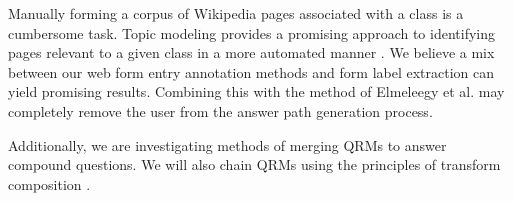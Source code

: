 Manually forming a corpus of Wikipedia pages associated with a class is a cumbersome task. Topic modeling provides a promising approach to identifying pages relevant to a given class in a more automated manner \cite{Blei2003latentdirichlet}. We believe a mix between our web form entry annotation methods and form label extraction \cite{1453931} can yield promising results. Combining this with the method of Elmeleegy et al. \cite{1687749} may completely remove the user from the answer path generation process.

Additionally, we are investigating methods of merging QRMs to answer compound questions.  We will also chain QRMs using the principles of transform composition \cite{transformscout}.


